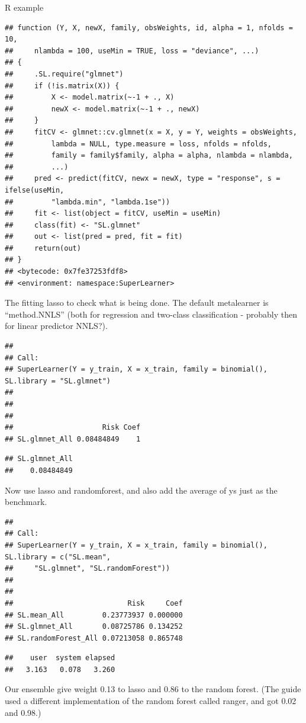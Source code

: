 \documentclass[
  ignorenonframetext,
]{beamer}
\begin{document}
\begin{frame}[fragile]
\begin{block}{R example}
\begin{verbatim}
## function (Y, X, newX, family, obsWeights, id, alpha = 1, nfolds = 10, 
##     nlambda = 100, useMin = TRUE, loss = "deviance", ...) 
## {
##     .SL.require("glmnet")
##     if (!is.matrix(X)) {
##         X <- model.matrix(~-1 + ., X)
##         newX <- model.matrix(~-1 + ., newX)
##     }
##     fitCV <- glmnet::cv.glmnet(x = X, y = Y, weights = obsWeights, 
##         lambda = NULL, type.measure = loss, nfolds = nfolds, 
##         family = family$family, alpha = alpha, nlambda = nlambda, 
##         ...)
##     pred <- predict(fitCV, newx = newX, type = "response", s = ifelse(useMin, 
##         "lambda.min", "lambda.1se"))
##     fit <- list(object = fitCV, useMin = useMin)
##     class(fit) <- "SL.glmnet"
##     out <- list(pred = pred, fit = fit)
##     return(out)
## }
## <bytecode: 0x7fe37253fdf8>
## <environment: namespace:SuperLearner>
\end{verbatim}

The fitting lasso to check what is being done. The default metalearner
is ``method.NNLS'' (both for regression and two-class classification -
probably then for linear predictor NNLS?).

\begin{verbatim}
## 
## Call:  
## SuperLearner(Y = y_train, X = x_train, family = binomial(), SL.library = "SL.glmnet") 
## 
## 
## 
##                     Risk Coef
## SL.glmnet_All 0.08484849    1
\end{verbatim}

\begin{verbatim}
## SL.glmnet_All 
##    0.08484849
\end{verbatim}

Now use lasso and randomforest, and also add the average of ys just as
the benchmark.

\begin{verbatim}
## 
## Call:  
## SuperLearner(Y = y_train, X = x_train, family = binomial(), SL.library = c("SL.mean",  
##     "SL.glmnet", "SL.randomForest")) 
## 
## 
##                           Risk     Coef
## SL.mean_All         0.23773937 0.000000
## SL.glmnet_All       0.08725786 0.134252
## SL.randomForest_All 0.07213058 0.865748
\end{verbatim}

\begin{verbatim}
##    user  system elapsed 
##   3.163   0.078   3.260
\end{verbatim}

Our ensemble give weight 0.13 to lasso and 0.86 to the random forest.
(The guide used a different implementation of the random forest called
ranger, and got 0.02 and 0.98.)


\end{block}
\end{frame}
\end{document}
